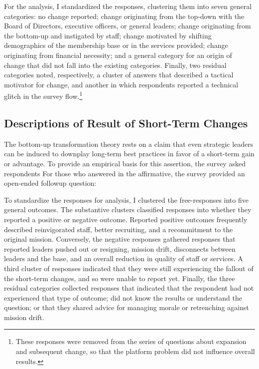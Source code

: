 For the analysis, I standardized the responses, clustering them into seven general categories: no change reported; change originating from the top-down with the Board of Directors, executive officers, or general leaders;  change originating from the bottom-up and instigated by staff; change motivated by shifting demographics of the membership base or in the services provided; change originating from financial necessity; and a general category for an origin of change that did not fall into the existing categories. Finally, two residual categories noted, respectively, a cluster of answers that described a tactical motivator for change, and another in which respondents reported a technical glitch in the survey flow.\footnote{These responses were removed from the series of questions about expansion and subsequent change, so that the platform problem did not influence overall results.}


\subsection{Descriptions of Result of Short-Term Changes}  

The bottom-up transformation theory rests on a claim that even strategic leaders can be induced to downplay long-term best practices in favor of a short-term gain or advantage. To provide an empirical basis for this assertion, the survey asked respondents  For those who answered in the affirmative, the survey provided an open-ended followup question: 

To standardize the responses for analysis, I clustered the free-responses into five general outcomes. The substantive clusters classified responses into whether they reported a positive or negative outcome. Reported positive outcomes frequently described reinvigorated staff, better recruiting, and a recommitment to the original mission. Conversely, the negative responses gathered responses that reported leaders pushed out or resigning, mission drift, disconnects between leaders and the base, and an overall reduction in quality of staff or services.  A  third cluster of responses indicated that they were still experiencing the fallout of the short-term changes, and so were unable to report yet. Finally, the three residual categories collected responses that indicated that the respondent had not experienced that type of outcome; did not know the results or understand the question; or that they shared advice for managing morale or retrenching against mission drift.

